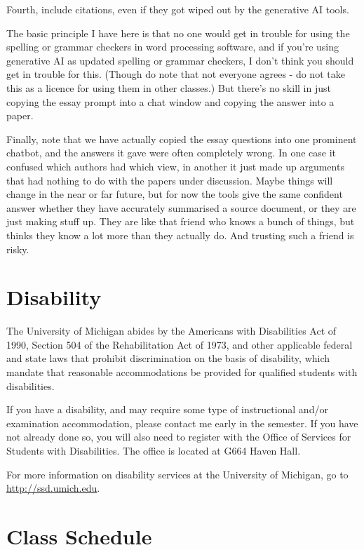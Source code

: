 \documentclass[
  12pt,
  letterpaper,
  DIV=11,
  numbers=noendperiod]{scrartcl}
\begin{document}
Fourth, include citations, even if they got wiped out by the generative
AI tools.

The basic principle I have here is that no one would get in trouble for
using the spelling or grammar checkers in word processing software, and
if you're using generative AI as updated spelling or grammar checkers, I
don't think you should get in trouble for this. (Though do note that not
everyone agrees - do not take this as a licence for using them in other
classes.) But there's no skill in just copying the essay prompt into a
chat window and copying the answer into a paper.

Finally, note that we have actually copied the essay questions into one
prominent chatbot, and the answers it gave were often completely wrong.
In one case it confused which authors had which view, in another it just
made up arguments that had nothing to do with the papers under
discussion. Maybe things will change in the near or far future, but for
now the tools give the same confident answer whether they have
accurately summarised a source document, or they are just making stuff
up. They are like that friend who knows a bunch of things, but thinks
they know a lot more than they actually do. And trusting such a friend
is risky.

\section{Disability}\label{disability}

The University of Michigan abides by the Americans with Disabilities Act
of 1990, Section 504 of the Rehabilitation Act of 1973, and other
applicable federal and state laws that prohibit discrimination on the
basis of disability, which mandate that reasonable accommodations be
provided for qualified students with disabilities.

If you have a disability, and may require some type of instructional
and/or examination accommodation, please contact me early in the
semester. If you have not already done so, you will also need to
register with the Office of Services for Students with Disabilities. The
office is located at G664 Haven Hall.

For more information on disability services at the University of
Michigan, go to \url{http://ssd.umich.edu}.

\section{Class Schedule}\label{class-schedule}
\end{document}
